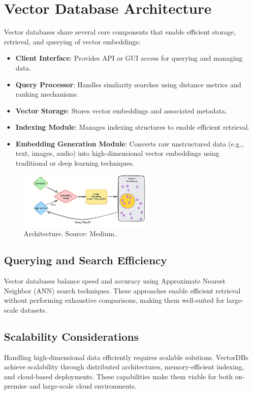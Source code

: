 \section{Vector Database Architecture}  

Vector databases share several core components that enable efficient storage, retrieval, and querying of vector embeddings:  

\begin{itemize}  
    \item \textbf{Client Interface}: Provides API or GUI access for querying and managing data.  
    \item \textbf{Query Processor}: Handles similarity searches using distance metrics and ranking mechanisms.  
    \item \textbf{Vector Storage}: Stores vector embeddings and associated metadata.  
    \item \textbf{Indexing Module}: Manages indexing structures to enable efficient retrieval.  
    \item \textbf{Embedding Generation Module}: Converts raw unstructured data (e.g., text, images, audio) into high-dimensional vector embeddings using traditional or deep learning techniques.  
\end{itemize}  
\begin{figure}[h]
    \centering
    \includegraphics[width=0.6\textwidth]{IMAGES/immagine_2025-02-24_100130378.png}
    \caption{Architecture. Source: Medium.\footnotemark.}
    \label{fig:Architecture}
\end{figure}
\subsection{Querying and Search Efficiency}  
Vector databases balance speed and accuracy using Approximate Nearest Neighbor (ANN) search techniques. These approaches enable efficient retrieval without performing exhaustive comparisons, making them well-suited for large-scale datasets.  

\subsection{Scalability Considerations}  
Handling high-dimensional data efficiently requires scalable solutions. VectorDBs achieve scalability through distributed architectures, memory-efficient indexing, and cloud-based deployments. These capabilities make them viable for both on-premise and large-scale cloud environments.  








